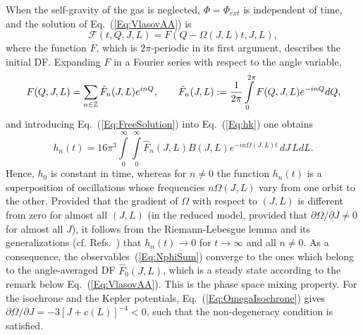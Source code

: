 When the self-gravity of the gas is neglected, $\Phi = \Phi_{ext}$ is independent of time, and the solution of Eq.~(\ref{Eq:VlasovAA}) is
\begin{equation}
\mathcal{F}(t,Q,J,L) = F(Q - \Omega(J,L)t,J,L),
\label{Eq:FreeSolution}
\end{equation}
where the function $F$, which is $2\pi$-periodic in its first argument, describes the initial DF. Expanding $F$ in a Fourier series with respect to the angle variable,
\begin{equation}
F(Q,J,L) = \sum\limits_{n\in\mathbb{Z}} \hat{F}_n(J,L) e^{inQ},\qquad
\hat{F}_n(J,L) := \frac{1}{2\pi}\int\limits_0^{2\pi} F(Q,J,L) e^{-inQ} dQ,
\label{Eq:FourierF}
\end{equation}
and introducing Eq.~(\ref{Eq:FreeSolution}) into Eq.~(\ref{Eq:hk}) one obtains
\begin{equation}
h_n(t) = 16\pi^3\int\limits_0^\infty\int\limits_0^\infty \hat{F}_n(J,L) B(J,L) e^{-in\Omega(J,L)t}\, dJ\, L dL.
\label{Eq:hnFree}
\end{equation}
Hence, $h_0$ is constant in time, whereas for $n\neq 0$ the function $h_n(t)$ is a superposition of oscillations whose frequencies $n\Omega(J,L)$ vary from one orbit to the other. Provided that the gradient of $\Omega$ with respect to $(J,L)$ is different from zero for almost all $(J,L)$ (in the reduced model, provided that $\partial\Omega/\partial J\neq 0$ for almost all $J$), it follows from the Riemann-Lebesgue lemma and its generalizations (cf. Refs.~\cite{cM19,pRoS20}) that $h_n(t)\to 0$ for $t\to \infty$ and all $n\neq 0$. As a consequence, the observables~(\ref{Eq:NphiSum}) converge to the ones which belong to the angle-averaged DF $\hat{F}_0(J,L)$, which is a steady state according to the remark below Eq.~(\ref{Eq:VlasovAA}). This is the phase space mixing property. For the isochrone and the Kepler potentials, Eq.~(\ref{Eq:OmegaIsochrone}) gives $\partial\Omega/\partial J = -3[J + c(L)]^{-4} < 0$, such that the non-degeneracy condition is satisfied.

